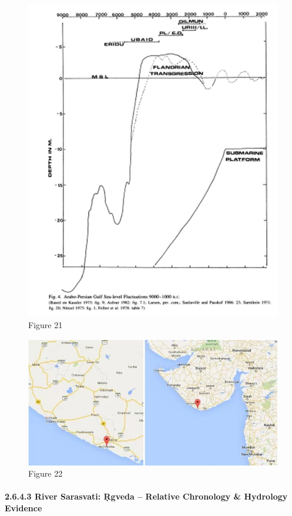 \begin{figure}
\includegraphics{"images/8-21.jpg"}
\caption{Figure 21}
\end{figure}


\begin{figure}
\includegraphics{"images/8-22.jpg"}
\caption{Figure 22}
\end{figure}


\paragraph{2.6.4.3 River Sarasvati: Ṛgveda – Relative Chronology \& Hydrology Evidence}

